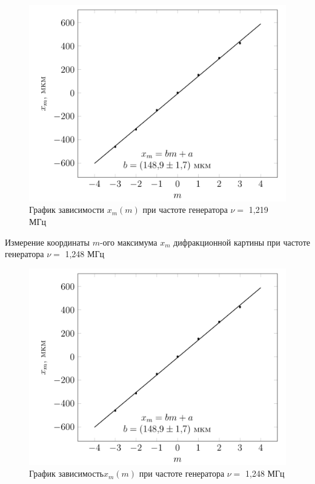 \documentclass[journal, a4paper]{IEEEtran}
\begin{document}
\begin{figure}[h!]
	\centering
	\includegraphics[width=1.02\linewidth]{1.png}
	\caption{График зависимости $  x_m(m) $ при частоте генератора $ \nu = $ 1,219 МГц}
	\label{nu2_graf}
\end{figure}

		\begin{table}[h!]
		\centering
		
		\caption{Измерение координаты $ m $-ого максимума $ x_m $ дифракционной картины при частоте генератора $ \nu = $ 1,248 МГц}
		\label{nu3}
	\end{table}	

\begin{figure}[h!]
	\centering
	\includegraphics[width=1.02\linewidth]{1.png}
	\caption{График зависимость$  x_m(m) $ при частоте генератора $ \nu = $ 1,248 МГц}
	\label{nu3_graf}
\end{figure}
\
\end{document}

